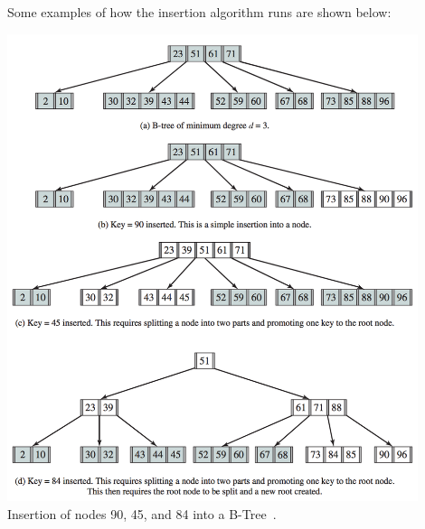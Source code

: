 Some examples of how the insertion algorithm runs are shown below:

\begin{center}
	\includegraphics[width=0.9\textwidth]{images/b-tree-insert.png}\\
	Insertion of nodes 90, 45, and 84 into a B-Tree~\cite{osi}.
\end{center}



